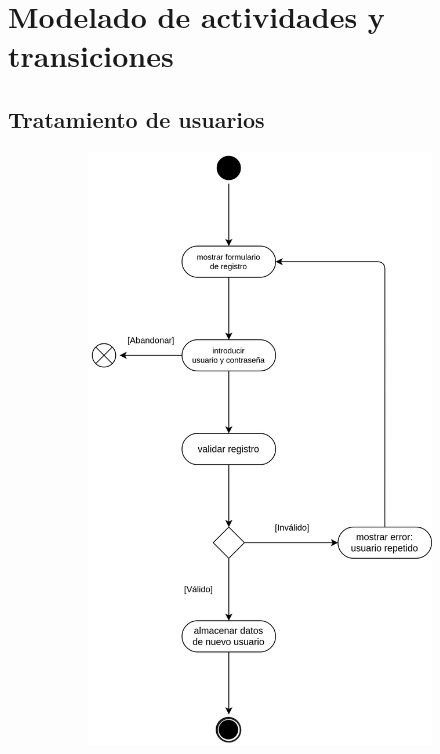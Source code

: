         \newpage
    
    
    \section{Modelado de actividades y transiciones}
        \label{sec:modelado-actividades-transiciones}
        
        \subsection{Tratamiento de usuarios}
        
            \begin{figure}[h]
                \centering
                \begin{subfigure}{0.45\textwidth}
                    \centering
                    \includegraphics[scale=0.15]{images/Diagramas/Actividades y transiciones 1.png}

\end{subfigure}
\end{figure}
